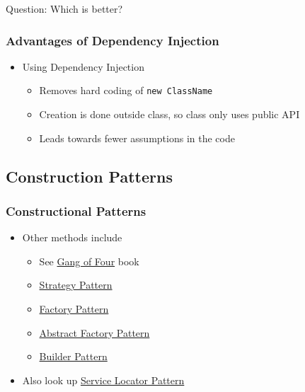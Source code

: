 Question: Which is better?

\subsubsection{Advantages of Dependency
Injection}\label{advantages-of-dependency-injection}

\begin{itemize}
\itemsep1pt\parskip0pt
\item
  Using Dependency Injection

  \begin{itemize}
  \itemsep1pt\parskip0pt
  \item
    Removes hard coding of \texttt{new ClassName}
  \item
    Creation is done outside class, so class only uses public API
  \item
    Leads towards fewer assumptions in the code
  \end{itemize}
\end{itemize}

\subsection{Construction Patterns}\label{construction-patterns}

\subsubsection{Constructional Patterns}\label{constructional-patterns}

\begin{itemize}
\itemsep1pt\parskip0pt
\item
  Other methods include

  \begin{itemize}
  \itemsep1pt\parskip0pt
  \item
    See \href{https://en.wikipedia.org/wiki/Design_Patterns}{Gang of
    Four} book
  \item
    \href{https://en.wikipedia.org/wiki/Strategy_pattern}{Strategy
    Pattern}
  \item
    \href{https://en.wikipedia.org/wiki/Factory_method_pattern}{Factory
    Pattern}
  \item
    \href{https://en.wikipedia.org/wiki/Abstract_factory_pattern}{Abstract
    Factory Pattern}
  \item
    \href{https://en.wikipedia.org/wiki/Builder_pattern}{Builder
    Pattern}\\
  \end{itemize}
\item
  Also look up
  \href{https://en.wikipedia.org/wiki/Service_locator_pattern}{Service
  Locator Pattern}
\end{itemize}

